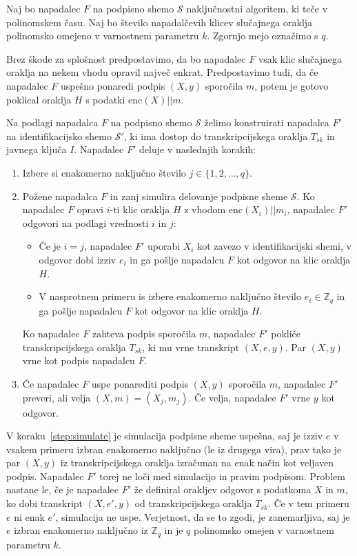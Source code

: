 \documentclass[isrm2, tisk]{fmfdelo}
\newcommand{\Z}{\mathbb Z}
\begin{document}
\begin{dokaz}
    Naj bo napadalec $F$ na podpisno shemo $\mathcal{S}$ naključnostni algoritem, ki teče v
    polinomskem času. Naj bo število napadalčevih klicev slučajnega oraklja polinomsko omejeno
    v varnostnem parametru $k$. Zgornjo mejo označimo s $q$.

    Brez škode za splošnost predpostavimo, da bo napadalec $F$ vsak klic slučajnega oraklja na
    nekem vhodu opravil največ enkrat. Predpostavimo tudi, da če napadalec $F$ uspešno ponaredi
    podpis $(X, y)$ sporočila $m$, potem je gotovo poklical oraklja $H$ s podatki $\text{enc}(X) || m$.

    Na podlagi napadalca $F$ na podpisno shemo $\mathcal{S}$ želimo konstruirati napadalca $F'$
    na identifikacijsko shemo $\mathcal{S'}$, ki ima dostop do transkripcijskega oraklja $T_{sk}$
    in javnega ključa $I$. Napadalec $F'$ deluje v naslednjih korakih:
    \begin{enumerate}
        \item Izbere si enakomerno naključno število $j \in \{1, 2, \dots, q\}$.
        \item Požene napadalca $F$ in zanj simulira delovanje podpisne sheme $\mathcal{S}$.
            Ko napadalec $F$ opravi $i$-ti klic oraklja $H$ z vhodom $\text{enc}(X_i) || m_i$,
            napadalec $F'$ odgovori na podlagi vrednosti $i$ in $j$:
            \begin{itemize}
                \item Če je $i = j$, napadalec $F'$ uporabi $X_i$ kot zavezo v identifikacijski
                    shemi, v odgovor dobi izziv $e_i$ in ga pošlje napadalcu $F$ kot odgovor na
                    klic oraklja $H$.
                \item V nasprotnem primeru is izbere enakomerno naključno število $e_i \in \Z_q$ in ga
                    pošlje napadalcu $F$ kot odgovor na klic oraklja $H$.
            \end{itemize}
            Ko napadalec $F$ zahteva podpis sporočila $m$, napadalec $F'$ pokliče transkripcijskega
            oraklja $T_{sk}$, ki mu vrne transkript $(X, e, y)$. Par $(X, y)$ vrne kot podpis
            napadalcu $F$.
        \label{step:simulate}
        \item Če napadalec $F$ uspe ponarediti podpis $(X, y)$ sporočila $m$, napadalec $F'$ preveri,
            ali velja $(X, m) = (X_j, m_j)$. Če velja, napadalec $F'$ vrne $y$ kot odgovor.
    \end{enumerate}
    V koraku~\ref{step:simulate} je simulacija podpisne sheme uspešna, saj je izziv $e$ v vsakem
    primeru izbran enakomerno naključno (le iz drugega vira), prav tako je par $(X, y)$ iz
    transkripcijskega oraklja izračunan na enak način kot veljaven podpis. Napadalec $F'$ torej ne
    loči med simulacijo in pravim podpisom. Problem nastane le, če je napadalec $F'$ že definiral
    orakljev odgovor s podatkoma $X$ in $m$, ko dobi transkript $(X, e', y)$ od transkripcijskega
    oraklja $T_{sk}$. Če v tem primeru $e$ ni enak $e'$, simulacija ne uspe. Verjetnost, da se to
    zgodi, je zanemarljiva, saj je $e$ izbran enakomerno naključno iz $\Z_q$ in je $q$ polinomsko
    omejen v varnostnem parametru $k$.


\end{dokaz}
\end{document}
